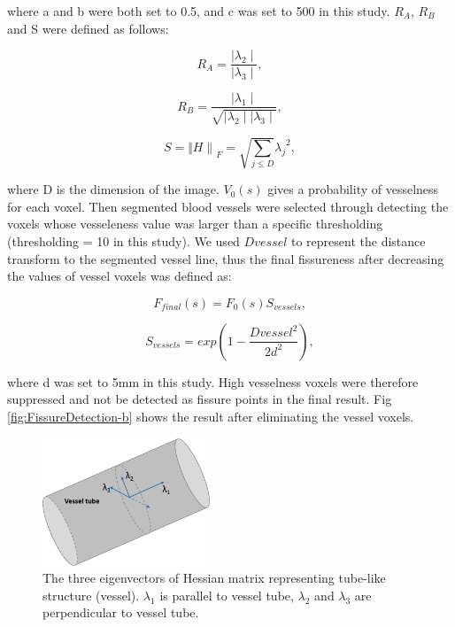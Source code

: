 {\noindent where a and b were both set to 0.5, and c was set to 500 in this study. $R_A$, $R_B$ and S were defined as follows:

\begin{equation}
\label{eq:VesselHessian2}
R_A = \frac{\mid\lambda_{2}\mid}{\mid\lambda_{3}\mid}, 
\end{equation}

\begin{equation}
\label{eq:VesselHessian3}
R_B = \frac{\mid\lambda_{1}\mid}{\sqrt{\mid\lambda_{2}\mid \mid\lambda_{3}\mid}},
\end{equation}

\begin{equation}
\label{eq:VesselHessian3}
S = {\Vert H \rVert}_F = \sqrt{\sum_{j\leq D}}{\lambda_j}^2,
\end{equation}

\noindent where D is the dimension of the image. $V_0(s)$ gives a probability of vesselness for each voxel. Then segmented blood vessels were selected through detecting the voxels whose vesseleness value was larger than a specific thresholding (thresholding = 10 in this study). We used $D{vessel}$ to represent the distance transform to the segmented vessel line, thus the final fissureness after decreasing the values of vessel voxels was defined as:

\begin{equation}
\label{eq:FinalFissureness}
F_{final}(s) = F_0(s)S_{vessels},
\end{equation}

\begin{equation}
\label{eq:FinalFissureness}
S_{vessels} = exp(1-\frac{{D{vessel}}^2}{2d^2}),
\end{equation}

\noindent  where d was set to 5mm in this study. High vesselness voxels were therefore suppressed and not be detected as fissure points in the final result. Fig \ref{fig:FissureDetection-b} shows the result after eliminating the vessel voxels.

\begin{figure}[htbp]
  \centering 
  \includegraphics[height=1.5in]{Segmentation/Image/VesselHessianEigenvector.png}
  \caption{The three eigenvectors of Hessian matrix representing tube-like structure (vessel). $\lambda_1$ is parallel to vessel tube, $\lambda_2$  and $\lambda_3$ are perpendicular to vessel tube.}
  \label{fig:VesselHessianEigenvector}
\end{figure}

}
